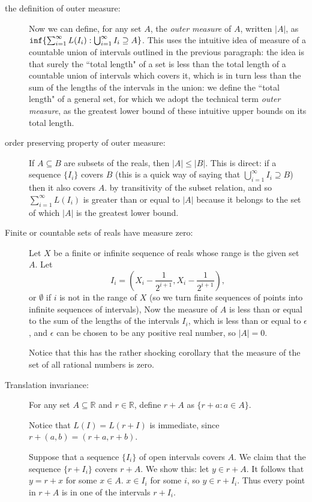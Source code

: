 \documentclass[12pt]{article}
\begin{document}
\begin{description}
\item[the definition of outer measure:]  Now we can define, for any set $A$, the {\em outer measure\/} of $A$, written $|A|$, as ${\tt inf}\{\sum_{i=1}^{\infty} L(I_i): \bigcup_{i=1}^{\infty} I_i \supseteq A\}$.  This uses
the intuitive idea of measure of a countable union of intervals outlined in the previous paragraph:  the idea is that surely the ``total length" of a set is less than the total length of a countable union of intervals which covers it, which is in turn less than the sum of the lengths of the intervals in the union:  we define the ``total length" of a general set, for which we adopt the technical term {\em outer measure\/}, as the greatest lower bound of these intuitive upper bounds on its total length.

\item[order preserving property of outer measure:]  If $A \subseteq B$ are subsets of the reals, then $|A| \leq |B|$.  This is direct:  if a sequence $\{I_i\}$ covers $B$ (this is a quick way of saying that $\bigcup_{i=1}^{\infty} I_i \supseteq B$) then it also covers $A$. by transitivity of the subset relation, and so $\sum_{i=1}^{\infty} L(I_i)$ is greater than or equal to $|A|$ because it belongs to the set of which $|A|$ is the greatest lower bound.

\item [Finite or countable sets of reals have measure zero:]   Let $X$ be a finite or infinite sequence of reals whose range is the given set $A$.  Let $$I_i = (X_i-\frac1{2^{i+1}},X_i-\frac1{2^{i+1}}),$$
or $\emptyset$ if $i$ is not in the range of $X$ (so we turn finite sequences of points into infinite sequences of intervals),  Now the measure of $A$ is less than or equal to the sum of the lengths of the intervals $I_i$, which is less than or equal to $\epsilon$, and $\epsilon$ can be chosen to be any positive real number, so $|A|=0$.

Notice that this has the rather shocking corollary that the measure of the set of all rational numbers is zero.

\item[Translation invariance:]  For any set $A \subseteq \mathbb R$ and $r \in \mathbb R$, define $r + A$ as $\{r+a:a \in A\}$.

Notice that $L(I) = L(r+I)$ is immediate, since $r+(a,b) = (r+a,r+b)$.

Suppose that a sequence $\{I_i\}$ of open intervals covers $A$.  We claim that the sequence $\{r+I_i\}$ covers $r+A$.  We show this:  let $y \in r+A$.  It follows that
$y = r+x$ for some $x \in A$.  $x \in I_i$ for some $i$, so $y \in r+I_i$.  Thus every point in $r+A$ is in one of the intervals $r+I_i$.


\end{description}
\end{document}
